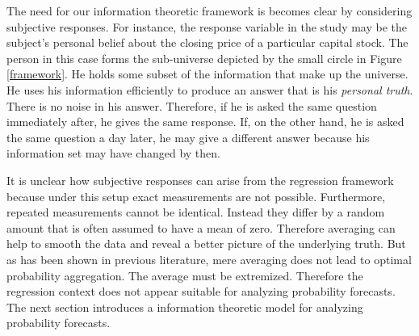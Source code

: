 \documentclass[11pt,twoside]{article}
\begin{document}
The need for our information theoretic framework is becomes clear by considering subjective responses. For instance, the response variable in the study may be the subject's personal belief about the closing price of a particular capital stock. The person in this case forms the sub-universe depicted by the small circle in Figure \ref{framework}. He holds some subset of  the information that make up the universe. He uses his information efficiently to produce an answer that is his \textit{personal truth}. There is no noise in his answer. Therefore, if he is asked the same question immediately after, he gives the same response. If, on the other hand, he is asked the same question a day later, he may give a different answer because his information set may have changed by then. 

It is unclear how subjective responses can arise from the regression framework because under this setup exact measurements are not possible. Furthermore, repeated measurements cannot be identical. Instead they differ by a random amount that is often assumed to have a mean of zero. Therefore averaging can help to smooth the data and reveal a better picture of the underlying truth. But as has been shown in previous literature, mere averaging does not lead to optimal probability aggregation. The average must be extremized. Therefore the regression context does not appear suitable for analyzing probability forecasts. The next section introduces a information theoretic model for analyzing probability forecasts. 


%
%
%
\end{document}
